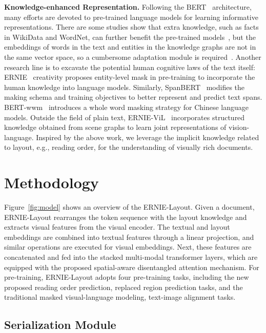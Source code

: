 \documentclass[11pt]{article}
\begin{document}
\noindent\textbf{Knowledge-enhanced Representation.}
Following the BERT~\cite{devlin2019bert} architecture, many efforts are devoted to pre-trained language models for learning informative representations. 
There are some studies show that extra knowledge, such as facts in WikiData and WordNet, can further benefit the pre-trained models~\cite{zhang2019ernie,liu2020kbert,he2020bert,wang2021kepler}, but the embeddings of words in the text and entities in the knowledge graphs are not in the same vector space, so a cumbersome adaptation module is required~\cite{he2020bert,wang2021kadapter}.
Another research line is to excavate the potential human cognitive laws of the text itself:
ERNIE~\cite{sun2019ernie} creativity proposes entity-level mask in pre-training to incorporate the human knowledge into language models.
Similarly, SpanBERT~\cite{joshi2020spanbert} modifies the making schema and training objectives to better represent and predict text spans.
BERT-wwm~\cite{cui2021pre} introduces a whole word masking strategy for Chinese language models.
Outside the field of plain text, ERNIE-ViL~\cite{yu2021ernie} incorporates structured knowledge obtained from scene graphs to learn joint representations of vision-language.
Inspired by the above work, we leverage the implicit knowledge related to layout, e.g., reading order, for the understanding of visually rich documents.

 
 
\section{Methodology}

Figure~\ref{fig:model} shows an overview of the ERNIE-Layout.
Given a document, ERNIE-Layout rearranges the token sequence with the layout knowledge and extracts visual features from the visual encoder.
The textual and layout embeddings are combined into textual features through a linear projection, and similar operations are executed for visual embeddings. 
Next, these features are concatenated and fed into the stacked multi-modal transformer layers, which are equipped with the proposed spatial-aware disentangled attention mechanism.
For pre-training, ERNIE-Layout adopts four pre-training tasks, including the new proposed reading order prediction, replaced region prediction tasks, and the traditional masked visual-language modeling, text-image alignment tasks.


\subsection{Serialization Module}
\label{sec:document-parser}
\end{document}
